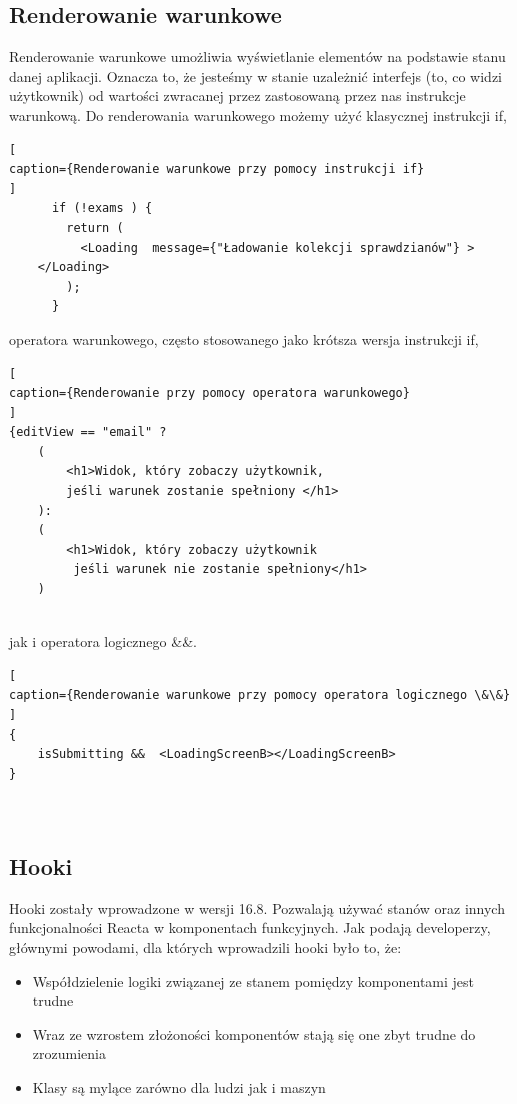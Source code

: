 \documentclass[oneside,polski,logo,indent]{amuthesis}
\begin{document}
\subsection{Renderowanie warunkowe}

Renderowanie warunkowe umożliwia wyświetlanie elementów na podstawie stanu danej aplikacji. Oznacza to, że jesteśmy w stanie uzależnić interfejs (to, co widzi użytkownik) od wartości zwracanej przez zastosowaną przez nas instrukcje warunkową.
Do renderowania warunkowego możemy użyć klasycznej instrukcji if,

\begin{lstlisting}[
caption={Renderowanie warunkowe przy pomocy instrukcji if}
]
      if (!exams ) {
        return (
          <Loading  message={"Ładowanie kolekcji sprawdzianów"} >
	</Loading>
        );
      }

\end{lstlisting}

operatora warunkowego, często stosowanego jako krótsza wersja instrukcji if,

\begin{lstlisting}[
caption={Renderowanie przy pomocy operatora warunkowego}
]
{editView == "email" ?
	(
		<h1>Widok, który zobaczy użytkownik,
		jeśli warunek zostanie spełniony </h1>
	):
	(
		<h1>Widok, który zobaczy użytkownik
		 jeśli warunek nie zostanie spełniony</h1>
	)


\end{lstlisting}

jak i operatora logicznego \&\&.

\begin{lstlisting}[
caption={Renderowanie warunkowe przy pomocy operatora logicznego \&\&}
]
{
	isSubmitting &&  <LoadingScreenB></LoadingScreenB>
}  



\end{lstlisting}




\subsection{Hooki}
Hooki zostały wprowadzone w wersji 16.8. Pozwalają używać stanów oraz innych funkcjonalności Reacta w komponentach funkcyjnych.
\newline
Jak podają developerzy, głównymi powodami, dla których wprowadzili hooki było to, że:

\begin{itemize}
\item Współdzielenie logiki związanej ze stanem pomiędzy komponentami jest trudne
\item Wraz ze wzrostem złożoności komponentów stają się one zbyt trudne do zrozumienia
\item Klasy są mylące zarówno dla ludzi jak i maszyn
\end{itemize}
\end{document}
